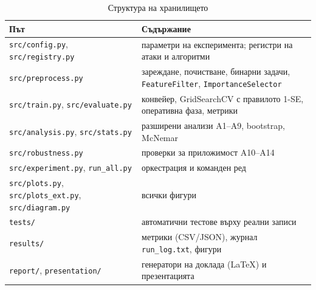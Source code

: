 \begin{table}[H]
\centering\small
\caption{Структура на хранилището}\label{tab:repo}
\begin{tabularx}{\textwidth}{@{}lL@{}}
\toprule
\textsf{\textbf{Път}} & \textsf{\textbf{Съдържание}}\\
\midrule
\texttt{src/config.py}, \texttt{src/registry.py} & параметри на експеримента; регистри на атаки и алгоритми\\
\texttt{src/preprocess.py} & зареждане, почистване, бинарни задачи, \texttt{FeatureFilter}, \texttt{ImportanceSelector}\\
\texttt{src/train.py}, \texttt{src/evaluate.py} & конвейер, GridSearchCV с правилото 1-SE, оперативна фаза, метрики\\
\texttt{src/analysis.py}, \texttt{src/stats.py} & разширени анализи A1--A9, bootstrap, McNemar\\
\texttt{src/robustness.py} & проверки за приложимост A10--A14\\
\texttt{src/experiment.py}, \texttt{run\_all.py} & оркестрация и команден ред\\
\texttt{src/plots.py}, \texttt{src/plots\_ext.py}, \texttt{src/diagram.py} & всички фигури\\
\texttt{tests/} & автоматични тестове върху реални записи\\
\texttt{results/} & метрики (CSV/JSON), журнал \texttt{run\_log.txt}, фигури\\
\texttt{report/}, \texttt{presentation/} & генератори на доклада (LaTeX) и презентацията\\
\bottomrule
\end{tabularx}
\end{table}
